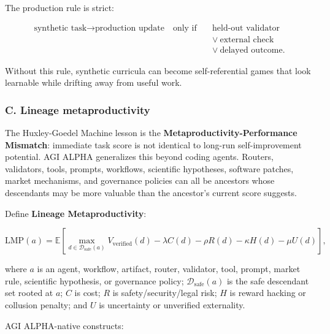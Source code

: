 The production rule is strict:

\[
\begin{aligned}
\text{synthetic task} \rightarrow \text{production update}
\quad\text{only if}\quad&
\text{held-out validator}\\
&\lor\ \text{external check}\\
&\lor\ \text{delayed outcome}.
\end{aligned}
\]

Without this rule, synthetic curricula can become self-referential games
that look learnable while drifting away from useful work.

\subsubsection{C. Lineage
metaproductivity}\label{c.-lineage-metaproductivity}

The Huxley-Goedel Machine lesson is the
\textbf{Metaproductivity-Performance Mismatch}: immediate task score is
not identical to long-run self-improvement potential. AGI ALPHA
generalizes this beyond coding agents. Routers, validators, tools,
prompts, workflows, scientific hypotheses, software patches, market
mechanisms, and governance policies can all be ancestors whose
descendants may be more valuable than the ancestor's current score
suggests.

Define \textbf{Lineage Metaproductivity}:

\[
\mathrm{LMP}(a)=
\mathbb{E}\left[
\max_{d\in\mathcal{D}_{\mathrm{safe}}(a)}
V_{\mathrm{verified}}(d)
-\lambda C(d)
-\rho R(d)
-\kappa H(d)
-\mu U(d)
\right],
\]

where \(a\) is an agent, workflow, artifact, router, validator, tool,
prompt, market rule, scientific hypothesis, or governance policy;
\(\mathcal{D}_{\mathrm{safe}}(a)\) is the safe descendant set rooted at
\(a\); \(C\) is cost; \(R\) is safety/security/legal risk; \(H\) is
reward hacking or collusion penalty; and \(U\) is uncertainty or
unverified externality.

AGI ALPHA-native constructs:

